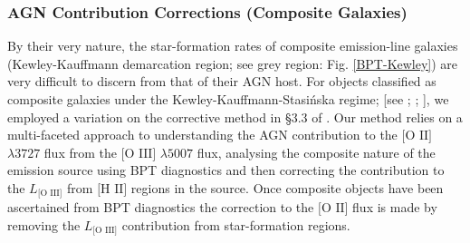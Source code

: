 \subsubsection{AGN Contribution Corrections (Composite Galaxies)}

By their very nature, the star-formation rates of composite emission-line galaxies (Kewley-Kauffmann demarcation region; see grey region: Fig. \ref{BPT-Kewley}) are very difficult to discern from that of their AGN host. For objects classified as composite galaxies under the Kewley-Kauffmann-Stasi{\'n}ska regime; [see \cite{Kewley_Dopita_Sutherland_Heisler_Trevena_2001}; \cite{Kauffmann_2003}; \cite{Stasinska_2006}], we employed a variation on the corrective method in §3.3 of \cite{Wild_2010}. Our method relies on a multi-faceted approach to understanding the AGN contribution to the $\text{[O II]}$ $\lambda3727$ flux from the $\text{[O III]}$ $\lambda5007$ flux, analysing the composite nature of the emission source using BPT diagnostics and then correcting the contribution to the $L_{\text{[O III]}}$ from $\text{[H II]}$ regions in the source. Once composite objects have been ascertained from BPT diagnostics the correction to the $\text{[O II]}$ flux is made by removing the $L_{\text{[O III]}}$ contribution from star-formation regions.   
  
  
  
  
  